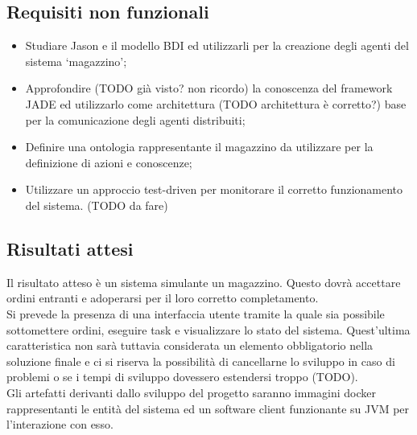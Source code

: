 \subsection{Requisiti non funzionali}
\begin{itemize}
    \item Studiare Jason e il modello BDI ed utilizzarli per la creazione degli agenti del sistema `magazzino';
    \item Approfondire (TODO già visto? non ricordo) la conoscenza del framework JADE ed utilizzarlo come architettura (TODO architettura è corretto?) base per la comunicazione degli agenti distribuiti;
    \item Definire una ontologia rappresentante il magazzino da utilizzare per la definizione di azioni e conoscenze;
    \item Utilizzare un approccio test-driven per monitorare il corretto funzionamento del sistema. (TODO da fare)
\end{itemize}

\subsection{Risultati attesi}
Il risultato atteso è un sistema simulante un magazzino. Questo dovrà accettare ordini entranti e adoperarsi per il loro corretto completamento.\\
Si prevede la presenza di una interfaccia utente tramite la quale sia possibile sottomettere ordini, eseguire task e visualizzare lo stato del sistema. Quest'ultima caratteristica non sarà tuttavia considerata un elemento obbligatorio nella soluzione finale e ci si riserva la possibilità di cancellarne lo sviluppo in caso di problemi o se i tempi di sviluppo dovessero estendersi troppo (TODO).\\
Gli artefatti derivanti dallo sviluppo del progetto saranno immagini docker rappresentanti le entità del sistema ed un software client funzionante su JVM per l'interazione con esso.


